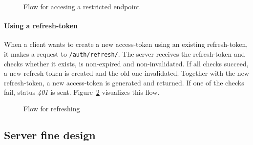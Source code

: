 \begin{figure}
    \centering

    \caption{Flow for accesing a restricted endpoint}
    \label{fig:using-access-token}
\end{figure}

\paragraph{Using a refresh-token}
When a client wants to create a new access-token using an existing refresh-token, it makes a request to \texttt{/auth/refresh/}.
The server receives the refresh-token and checks whether it exists, is non-expired and non-invalidated.
If all checks succeed, a new refresh-token is created and the old one invalidated.
Together with the new refresh-token, a new access-token is generated and returned.
If one of the checks fail, status \textit{401} is sent. \newline
Figure~\ref{fig:using-refresh-token} visualizes this flow.

\begin{figure}
    \centering

    \caption{Flow for refreshing}
    \label{fig:using-refresh-token}
\end{figure}

\subsection{Server fine design}\label{subsec:server-fine-design}
